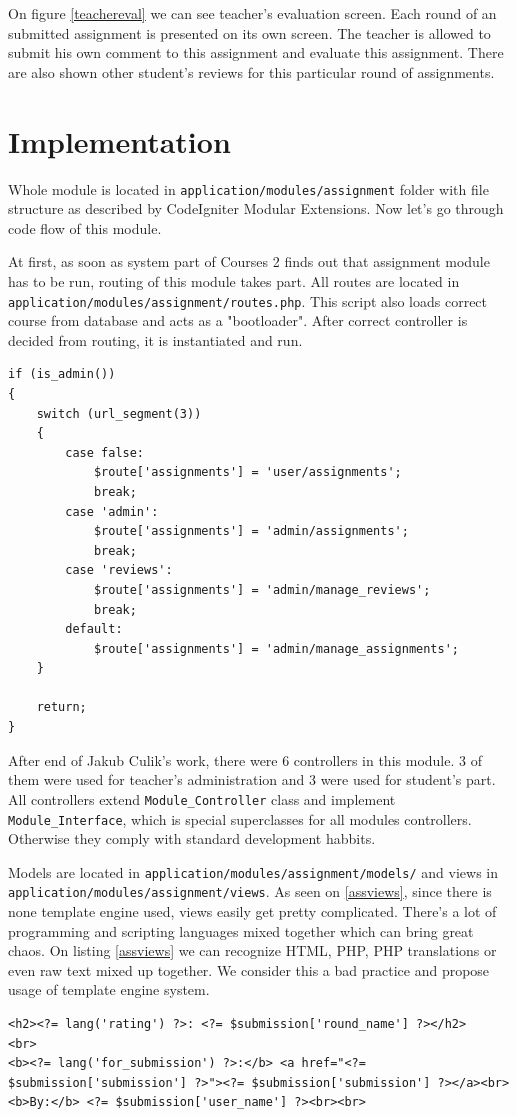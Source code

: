 On figure \ref{teachereval} we can see teacher's evaluation screen. Each round of an submitted assignment is presented on its own screen. The teacher is allowed to submit his own comment to this assignment and evaluate this assignment. There are also shown other student's reviews for this particular round of assignments. 

\section{Implementation}

Whole module is located in \texttt{application/modules/assignment} folder with file structure as described by CodeIgniter Modular Extensions. Now let's go through code flow of this module.


At first, as soon as system part of Courses 2 finds out that assignment module has to be run, routing of this module takes part. All routes are located in \texttt{application/modules/assignment/routes.php}. This script also loads correct course from database and acts as a "bootloader". After correct controller is decided from routing, it is instantiated and run.

\begin{lstlisting}[label={assrouting}, caption={Routing in assignments module for administrator}]
if (is_admin())
{
    switch (url_segment(3))
    {
        case false:
            $route['assignments'] = 'user/assignments';
            break;
        case 'admin':
            $route['assignments'] = 'admin/assignments';
            break;
        case 'reviews':
            $route['assignments'] = 'admin/manage_reviews';
            break;
        default:
            $route['assignments'] = 'admin/manage_assignments';
    }

    return;
}
\end{lstlisting}


After end of Jakub Culik's \cite{culik} work, there were 6 controllers in this module. 3 of them were used for teacher's administration and 3 were used for student's part. All controllers extend \texttt{Module\_Controller} class and implement \texttt{Module\_Interface}, which is special superclasses for all modules controllers. Otherwise they comply with standard development habbits.


Models are located in \texttt{application/modules/assignment/models/} and views in \texttt{application/modules/assignment/views}. As seen on \ref{assviews}, since there is none template engine used, views easily get pretty complicated. There's a lot of programming and scripting languages mixed together which can bring great chaos. On listing \ref{assviews} we can recognize HTML, PHP, PHP translations or even raw text mixed up together. We consider this a bad practice and propose usage of template engine system.

\begin{lstlisting}[label={assviews}, caption={Example of view in assignments module}]
<h2><?= lang('rating') ?>: <?= $submission['round_name'] ?></h2>
<br>
<b><?= lang('for_submission') ?>:</b> <a href="<?= $submission['submission'] ?>"><?= $submission['submission'] ?></a><br>
<b>By:</b> <?= $submission['user_name'] ?><br><br>
\end{lstlisting}
